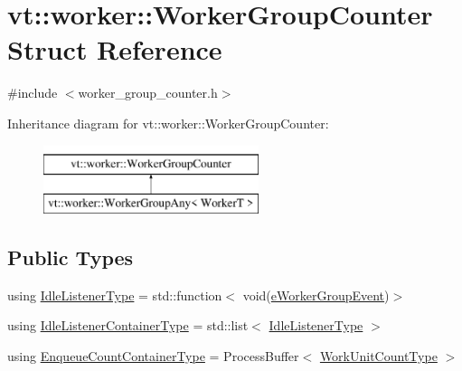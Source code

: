 \hypertarget{structvt_1_1worker_1_1_worker_group_counter}{}\section{vt\+:\+:worker\+:\+:Worker\+Group\+Counter Struct Reference}
\label{structvt_1_1worker_1_1_worker_group_counter}


{\ttfamily \#include $<$worker\+\_\+group\+\_\+counter.\+h$>$}

Inheritance diagram for vt\+:\+:worker\+:\+:Worker\+Group\+Counter\+:\begin{figure}[H]
\begin{center}
\leavevmode
\includegraphics[height=2.000000cm]{structvt_1_1worker_1_1_worker_group_counter}
\end{center}
\end{figure}
\subsection*{Public Types}
\begin{DoxyCompactItemize}
\item 
using \hyperlink{structvt_1_1worker_1_1_worker_group_counter_ae91ad4af172549bb99e1b7c32a1a0f71}{Idle\+Listener\+Type} = std\+::function$<$ void(\hyperlink{namespacevt_1_1worker_abcb798436f1cdc4fab035def5b912d1f}{e\+Worker\+Group\+Event})$>$
\item 
using \hyperlink{structvt_1_1worker_1_1_worker_group_counter_a27ecc5576966def3b786c8470e3fbf9d}{Idle\+Listener\+Container\+Type} = std\+::list$<$ \hyperlink{structvt_1_1worker_1_1_worker_group_counter_ae91ad4af172549bb99e1b7c32a1a0f71}{Idle\+Listener\+Type} $>$
\item 
using \hyperlink{structvt_1_1worker_1_1_worker_group_counter_ab0ceac7975b91fa9c08f8c416a4ea1cc}{Enqueue\+Count\+Container\+Type} = Process\+Buffer$<$ \hyperlink{namespacevt_1_1worker_a8080c49350b0520151601a8b24d6c6cf}{Work\+Unit\+Count\+Type} $>$
\end{DoxyCompactItemize}
